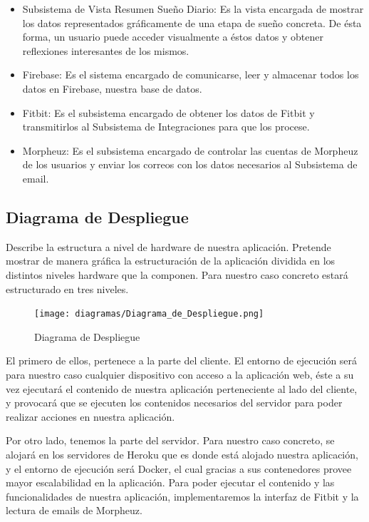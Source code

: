 \documentclass[11pt,openany]{book}
\begin{document}
\begin{itemize}
\item Subsistema de Vista Resumen Sueño Diario: Es la vista encargada de mostrar los datos representados gráficamente de una etapa de sueño concreta. De ésta forma, un usuario puede acceder visualmente a éstos datos y obtener reflexiones interesantes de los mismos.
\item Firebase: Es el sistema encargado de comunicarse, leer y almacenar todos los datos en Firebase, nuestra base de datos.
\item Fitbit: Es el subsistema encargado de obtener los datos de Fitbit y transmitirlos al Subsistema de Integraciones para que los procese.
\item Morpheuz: Es el subsistema encargado de controlar las cuentas de Morpheuz de los usuarios y enviar los correos con los datos necesarios al Subsistema de email.
\end{itemize}

\subsection{Diagrama de Despliegue}

Describe la estructura a nivel de hardware de nuestra aplicación. Pretende mostrar de manera gráfica la estructuración de la aplicación dividida en los distintos niveles hardware que la componen. Para nuestro caso concreto estará estructurado en tres niveles.

\begin{figure}[H]
\centering
\texttt{[image: diagramas/Diagrama\_de\_Despliegue.png]}
\caption{Diagrama de Despliegue}
\end{figure}

El primero de ellos, pertenece a la parte del cliente. El entorno de ejecución será para nuestro caso cualquier dispositivo con acceso a la aplicación web, éste a su vez ejecutará el contenido de nuestra aplicación perteneciente al lado del cliente, y provocará que se ejecuten los contenidos necesarios del servidor para poder realizar acciones en nuestra aplicación.

Por otro lado, tenemos la parte del servidor. Para nuestro caso concreto, se alojará en los servidores de Heroku que es donde está alojado nuestra aplicación, y el entorno de ejecución será Docker, el cual gracias a sus contenedores provee mayor escalabilidad en la aplicación. Para poder ejecutar el contenido y las funcionalidades de nuestra aplicación, implementaremos la interfaz de Fitbit y la lectura de emails de Morpheuz. 
\end{document}
